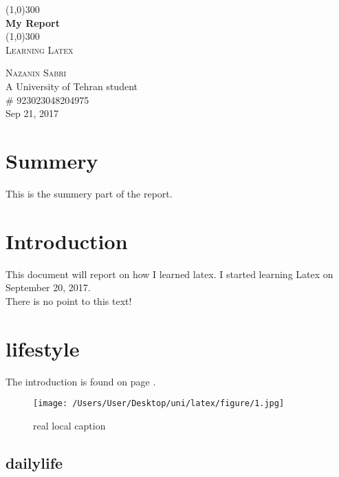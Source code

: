 \documentclass{article}
\begin{document}
\begin{titlepage}
	\begin{center}

	\line(1,0){300}\\
	[0.25in]
	\huge{\bfseries My Report}\\
	[2mm]
	\line(1,0){300}\\
	[0.75cm]
	\textsc{\large Learning Latex}\\
	[10cm]
	\end{center}

	\begin{flushright}
	\textsc{\large Nazanin Sabri\\}
	A University of Tehran student\\
	\# 923023048204975\\
	Sep 21, 2017
	\end{flushright}

\end{titlepage}


\section*{Summery}
This is the summery part of the report. 
\cleardoublepage


\tableofcontents
\thispagestyle{empty}
\cleardoublepage

\setcounter{page}{1}

\section{Introduction}\label{sec:intro}
This document will report on how I learned latex. I started learning Latex on September 20, 2017.\\ There is no point to this text!\\
\lipsum[1]

\newpage
\section{lifestyle}\label{sec:lifestyle}
The introduction is found on page \pageref{sec:intro}.


\lipsum[2]
\begin{figure}
	\centering 
	\texttt{[image: /Users/User/Desktop/uni/latex/figure/1.jpg]}
	\caption[Optional caption]{real local caption}
\end{figure}


\subsection{dailylife}
\lipsum[1]
\end{document}
